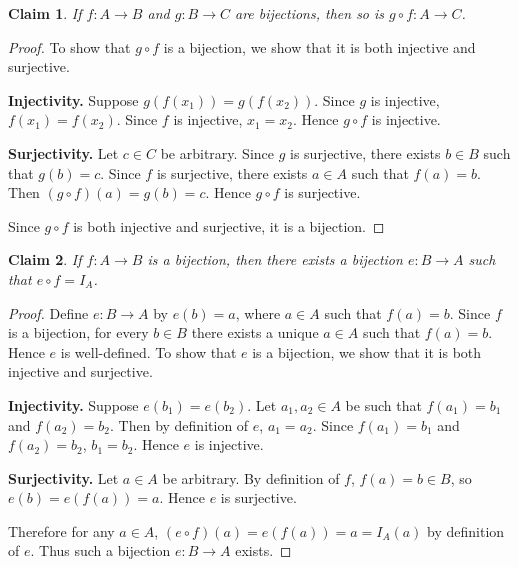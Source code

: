 \documentclass{article}
\newtheorem{claim}{Claim}
\begin{document}
\begin{claim}
    If $f : A \to B$ and $g : B \to C$ are bijections, then so is $g \circ f : A \to C$.
\end{claim}

\begin{proof}
    To show that $g \circ f$ is a bijection, we show that it is both injective and 
    surjective.

    \medskip
    \textbf{Injectivity.}
    Suppose $g(f(x_1)) = g(f(x_2))$. Since $g$ is injective, $f(x_1) = f(x_2)$. Since $f$
    is injective, $x_1 = x_2$. Hence $g \circ f$ is injective.

    \medskip
    \textbf{Surjectivity.}
    Let $c \in C$ be arbitrary. Since $g$ is surjective, there exists $b \in B$ such that
    $g(b) = c$. Since $f$ is surjective, there exists $a \in A$ such that $f(a) = b$. Then
    $(g \circ f)(a) = g(b) = c$. Hence $g \circ f$ is surjective.

    \medskip

    Since $g \circ f$ is both injective and surjective, it is a bijection.
\end{proof}

\begin{claim}
    If $f : A \to B$ is a bijection, then there exists a bijection $e : B \to A$ such that
    $e \circ f = I_A$.
\end{claim}

\begin{proof}
    Define $e : B \to A$ by $e(b) = a$, where $a \in A$ such that $f(a) = b$. Since $f$ is
    a bijection, for every $b \in B$ there exists a unique $a \in A$ such that $f(a) = b$.
    Hence $e$ is well-defined. To show that $e$ is a bijection, we show that it is both 
    injective and surjective.

    \medskip
    \textbf{Injectivity.}
    Suppose $e(b_1) = e(b_2)$. Let $a_1, a_2 \in A$ be such that $f(a_1) = b_1$ and $f(a_2) 
    = b_2$. Then by definition of $e$, $a_1 = a_2$. Since $f(a_1) = b_1$ and $f(a_2) = b_2$, 
    $b_1 = b_2$. Hence $e$ is injective.

    \medskip
    \textbf{Surjectivity.}
    Let $a \in A$ be arbitrary. By definition of $f$, $f(a) = b \in B$, so $e(b) = e(f(a)) 
    = a$. Hence $e$ is surjective.

    \medskip

    Therefore for any $a \in A$, $(e \circ f)(a) = e(f(a)) = a = I_A(a)$ by definition of $e$. 
    Thus such a bijection $e : B \to A$ exists. 
\end{proof}
\end{document}
